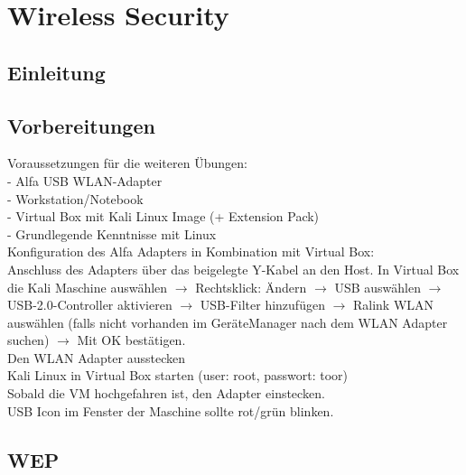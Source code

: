 \chapter{Wireless Security}

\section{Einleitung}

\section{Vorbereitungen}

Voraussetzungen für die weiteren Übungen:\\

- Alfa USB WLAN-Adapter\\
- Workstation/Notebook\\
- Virtual Box mit Kali Linux Image (+ Extension Pack)\\
- Grundlegende Kenntnisse mit Linux\\

Konfiguration des Alfa Adapters in Kombination mit Virtual Box:\\

Anschluss des Adapters über das beigelegte Y-Kabel an den Host.
In Virtual Box die Kali Maschine auswählen $\rightarrow$ Rechtsklick: Ändern $\rightarrow$ USB auswählen $\rightarrow$ USB-2.0-Controller aktivieren $\rightarrow$ USB-Filter hinzufügen
$\rightarrow$ Ralink WLAN auswählen (falls nicht vorhanden im GeräteManager nach dem WLAN Adapter suchen) $\rightarrow$ Mit OK bestätigen.\\
Den WLAN Adapter ausstecken\\

Kali Linux in Virtual Box starten (user: root, passwort: toor)\\
Sobald die VM hochgefahren ist, den Adapter einstecken.\\
USB Icon im Fenster der Maschine sollte rot/grün blinken.\\ %

\section{WEP}

